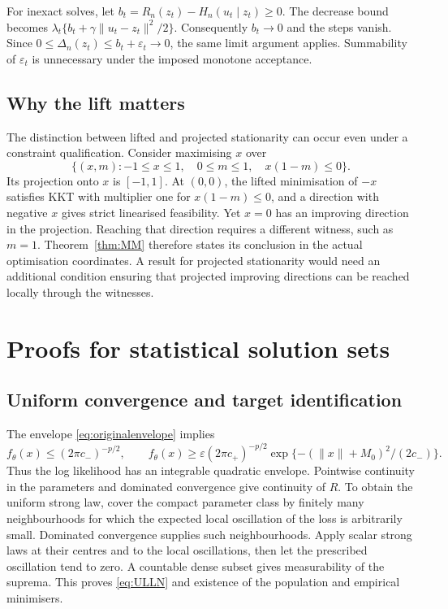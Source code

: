 \documentclass[12pt,a4paper]{article}
\theoremstyle{remark}
\begin{document}
For inexact solves, let $b_t=R_n(z_t)-H_n(u_t\mid z_t)\ge0$. The decrease bound becomes
$\lambda_t\{b_t+\gamma\|u_t-z_t\|^2/2\}$. Consequently $b_t\to0$ and the steps vanish. Since
$0\le\Delta_n(z_t)\le b_t+\varepsilon_t\to0$,
the same limit argument applies. Summability of $\varepsilon_t$ is unnecessary under the imposed monotone acceptance.

\subsection{Why the lift matters}

The distinction between lifted and projected stationarity can occur even under a constraint qualification. Consider maximising $x$ over
\[
 \{(x,m):-1\le x\le1,\quad0\le m\le1,\quad x(1-m)\le0\}.
\]
Its projection onto $x$ is $[-1,1]$. At $(0,0)$, the lifted minimisation of $-x$ satisfies KKT with multiplier one for $x(1-m)\le0$, and a direction with negative $x$ gives strict linearised feasibility. Yet $x=0$ has an improving direction in the projection. Reaching that direction requires a different witness, such as $m=1$. Theorem~\ref{thm:MM} therefore states its conclusion in the actual optimisation coordinates. A result for projected stationarity would need an additional condition ensuring that projected improving directions can be reached locally through the witnesses.

\section{Proofs for statistical solution sets}\label{app:statistics}

\subsection{Uniform convergence and target identification}

The envelope \eqref{eq:originalenvelope} implies
\[
 f_\theta(x)\le(2\pi c_-)^{-p/2},\qquad
 f_\theta(x)\ge\varepsilon(2\pi c_+)^{-p/2}
        \exp\{-(\|x\|+M_0)^2/(2c_-)\}.
\]
Thus the log likelihood has an integrable quadratic envelope. Pointwise continuity in the parameters and dominated convergence give continuity of $R$. To obtain the uniform strong law, cover the compact parameter class by finitely many neighbourhoods for which the expected local oscillation of the loss is arbitrarily small. Dominated convergence supplies such neighbourhoods. Apply scalar strong laws at their centres and to the local oscillations, then let the prescribed oscillation tend to zero. A countable dense subset gives measurability of the suprema. This proves \eqref{eq:ULLN} and existence of the population and empirical minimisers.
\end{document}
